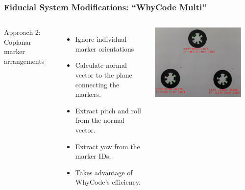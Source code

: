 \documentclass[aspectratio=169]{rubeamer}
\newif\ifpause
\newcommand{\mypause}{\ifpause \pause \fi}
\begin{document}
\begin{frame}
  \frametitle{Fiducial System Modifications: ``WhyCode Multi''}

  \begin{columns}
    Approach 2: Coplanar marker arrangements
    \begin{itemize}
      \mypause
      \item Ignore individual marker orientations
      \mypause
      \item Calculate normal vector to the plane connecting the markers.
      \mypause
      \item Extract pitch and roll from the normal vector.
      \mypause
      \item Extract yaw from the marker IDs.
      \mypause
      \item Takes advantage of WhyCode's efficiency.
    \end{itemize}
    \centering
    \onslide
    \includegraphics[width=0.9\textwidth]{cropped_whycode_3_8_jiri_example}
  \end{columns}
\end{frame}
\end{document}
